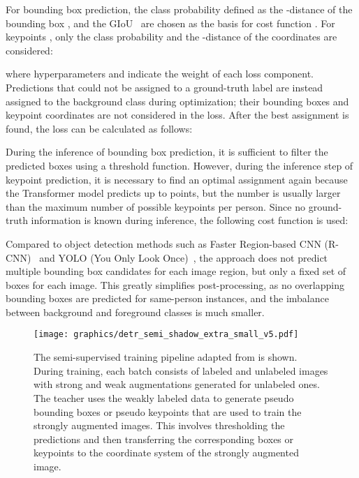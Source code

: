 \documentclass[sigconf]{acmart}
\begin{document}
For bounding box prediction, the class probability defined as the -distance of the bounding box , and the \ac{GIoU}~\cite{DBLP:conf/cvpr/RezatofighiTGS019}  are chosen as the basis for cost function . 
For keypoints , only the class probability and the -distance of the coordinates are considered:


where hyperparameters  and  indicate the weight of each loss component. 
Predictions that could not be assigned to a ground-truth label are instead assigned to the background class  during optimization; 
their bounding boxes and keypoint coordinates are not considered in the loss. 
After the best assignment is found, the loss can be calculated as follows:


During the inference of bounding box prediction, it is sufficient to filter the predicted boxes using a threshold function. However, during the inference step of keypoint prediction, it is necessary to find an optimal assignment again because the Transformer model predicts up to  points, but the number is usually larger than the maximum number of possible keypoints per person. Since no ground-truth information is known during inference, the following cost function is used:

Compared to object detection methods such as Faster Region-based CNN (R-CNN)~\cite{DBLP:conf/nips/RenHGS15} and YOLO (You Only Look Once)~\cite{DBLP:conf/cvpr/RedmonF17}, the approach does not predict multiple bounding box candidates for each image region, but only a fixed set of boxes for each image. 
This greatly simplifies post-processing, as no overlapping bounding boxes are predicted for same-person instances, and the imbalance between background and foreground classes is much smaller.


\begin{figure}
\begin{center}
\texttt{[image: graphics/detr\_semi\_shadow\_extra\_small\_v5.pdf]}
\end{center}
\caption{The semi-supervised training pipeline adapted from \citet{DBLP:conf/iccv/Xu00WWWB021} is shown. During training, each batch consists of labeled and unlabeled images with strong and weak augmentations generated for unlabeled ones. The teacher uses the weakly labeled data to generate pseudo bounding boxes or pseudo keypoints that are used to train the strongly augmented images. This involves thresholding the predictions and then transferring the corresponding boxes or keypoints to the coordinate system of the strongly augmented image.}
\label{fig:semi}
\end{figure}
\end{document}
